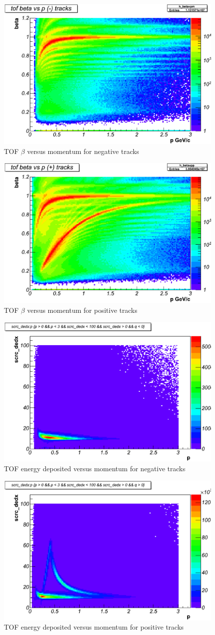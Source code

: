 \begin{figure}\begin{center}
	\includegraphics[width=.40\linewidth]{figures/calib/tof/Tof_56855_final_betavpm.eps}
	\caption{TOF $\beta$ versus momentum for negative tracks}
	\label{plt:tofbetavpneg}
\end{center}\end{figure}

\begin{figure}\begin{center}
	\includegraphics[width=.40\linewidth]{figures/calib/tof/Tof_56855_final_betavpp.eps}
	\caption{TOF $\beta$ versus momentum for positive tracks}
	\label{plt:tofbetavppos}
\end{center}\end{figure}

\begin{figure}\begin{center}
	\includegraphics[width=.40\linewidth]{figures/calib/tof/Tof_56855_final_dedxm.eps}
	\caption{TOF energy deposited versus momentum for negative tracks}
	\label{plt:tofEvpneg}
\end{center}\end{figure}

\begin{figure}\begin{center}
	\includegraphics[width=.40\linewidth]{figures/calib/tof/Tof_56855_final_dedxp.eps}
	\caption{TOF energy deposited versus momentum for positive tracks}
	\label{plt:tofEvppos}
\end{center}\end{figure}

